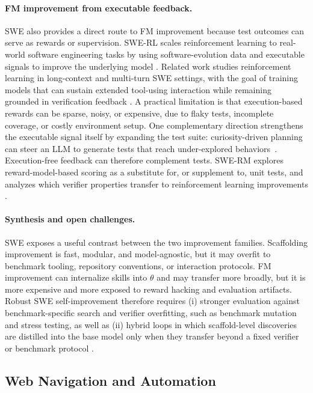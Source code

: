 \documentclass{article}
\begin{document}
\paragraph{FM improvement from executable feedback.}
SWE also provides a direct route to FM improvement because test outcomes can serve as rewards or supervision. SWE-RL scales reinforcement learning to real-world software engineering tasks by using software-evolution data and executable signals to improve the underlying model \citep{wei2025swerladvancingllmreasoning}. Related work studies reinforcement learning in long-context and multi-turn SWE settings, with the goal of training models that can sustain extended tool-using interaction while remaining grounded in verification feedback \citep{golubev2025traininglongcontextmultiturnsoftware}. A practical limitation is that execution-based rewards can be sparse, noisy, or expensive, due to flaky tests, incomplete coverage, or costly environment setup. One complementary direction strengthens the executable signal itself by expanding the test suite: curiosity-driven planning can steer an LLM to generate tests that reach under-explored behaviors~\citep{amayuelas2026planning}. Execution-free feedback can therefore complement tests. SWE-RM explores reward-model-based scoring as a substitute for, or supplement to, unit tests, and analyzes which verifier properties transfer to reinforcement learning improvements \citep{shum2025swermexecutionfreefeedbacksoftware}.

\paragraph{Synthesis and open challenges.}
SWE exposes a useful contrast between the two improvement families. Scaffolding improvement is fast, modular, and model-agnostic, but it may overfit to benchmark tooling, repository conventions, or interaction protocols. FM improvement can internalize skills into $\theta$ and may transfer more broadly, but it is more expensive and more exposed to reward hacking and evaluation artifacts. Robust SWE self-improvement therefore requires (i) stronger evaluation against benchmark-specific search and verifier overfitting, such as benchmark mutation and stress testing, as well as (ii) hybrid loops in which scaffold-level discoveries are distilled into the base model only when they transfer beyond a fixed verifier or benchmark protocol \citep{garg2026savingswebenchbenchmarkmutation}.

\subsection{Web Navigation and Automation}
\end{document}
